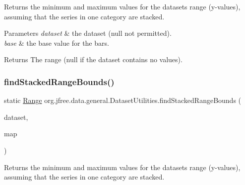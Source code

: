 Returns the minimum and maximum values for the dataset\textquotesingle{}s range (y-\/values), assuming that the series in one category are stacked.


\begin{DoxyParams}{Parameters}
{\em dataset} & the dataset ({\ttfamily null} not permitted). \\
\hline
{\em base} & the base value for the bars.\\
\hline
\end{DoxyParams}
\begin{DoxyReturn}{Returns}
The range ({\ttfamily null} if the dataset contains no values). 
\end{DoxyReturn}
\mbox{\label{classorg_1_1jfree_1_1data_1_1general_1_1_dataset_utilities_af22cfd881cb9fd99baccc3f70c5c94cf}} 
\subsubsection{\texorpdfstring{find\+Stacked\+Range\+Bounds()}{findStackedRangeBounds()}\hspace{0.1cm}{\footnotesize\ttfamily [3/5]}}
{\footnotesize\ttfamily static \mbox{\hyperlink{classorg_1_1jfree_1_1data_1_1_range}{Range}} org.\+jfree.\+data.\+general.\+Dataset\+Utilities.\+find\+Stacked\+Range\+Bounds (\begin{DoxyParamCaption}\item[{\mbox{\hyperlink{interfaceorg_1_1jfree_1_1data_1_1category_1_1_category_dataset}{Category\+Dataset}}}]{dataset,  }\item[{\mbox{\hyperlink{classorg_1_1jfree_1_1data_1_1_key_to_group_map}{Key\+To\+Group\+Map}}}]{map }\end{DoxyParamCaption})\hspace{0.3cm}{\ttfamily [static]}}

Returns the minimum and maximum values for the dataset\textquotesingle{}s range (y-\/values), assuming that the series in one category are stacked.


